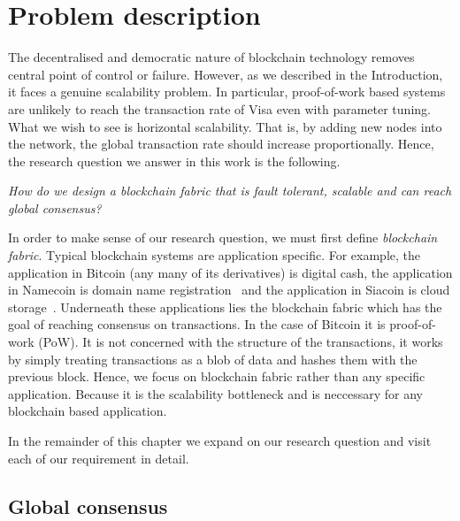 \chapter{Problem description}
\label{ch:problem}

The decentralised and democratic nature of blockchain technology removes central point of control or failure.
However, as we described in the Introduction, it faces a genuine scalability problem.
In particular, proof-of-work based systems are unlikely to reach the transaction rate of Visa even with parameter tuning.
What we wish to see is horizontal scalability.
That is, by adding new nodes into the network, the global transaction rate should increase proportionally.
Hence, the research question we answer in this  work is the following.
\begin{displayquote}
\emph{How do we design a blockchain fabric that is fault tolerant, scalable and can reach global consensus?}
\end{displayquote}

In order to make sense of our research question, we must first define \emph{blockchain fabric}.
Typical blockchain systems are application specific.
For example, the application in Bitcoin (any many of its derivatives) is digital cash, the application in Namecoin is domain name registration~\cite{namecoin} and the application in Siacoin is cloud storage~\cite{siacoin}.
Underneath these applications lies the blockchain fabric which has the goal of reaching consensus on transactions.
In the case of Bitcoin it is proof-of-work (PoW).
It is not concerned with the structure of the transactions,
it works by simply treating transactions as a blob of data and hashes them with the previous block.
Hence, we focus on blockchain fabric rather than any specific application.
Because it is the scalability bottleneck and is neccessary for any blockchain based application.

In the remainder of this chapter we expand on our research question and visit each of our requirement in detail.

\section{Global consensus}


